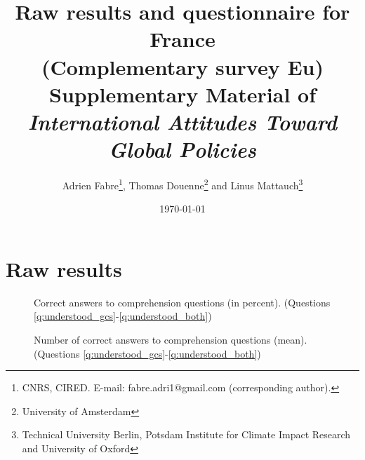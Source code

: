\documentclass[12pt,english]{article}
\title{Raw results and questionnaire for France \\
(Complementary survey Eu) \\ 
Supplementary Material of \\
\textit{International Attitudes Toward Global Policies}
}
\author{Adrien Fabre\footnote{CNRS, CIRED. E-mail: fabre.adri1@gmail.com (corresponding author).}, Thomas Douenne\footnote{University of Amsterdam}\; and Linus Mattauch\footnote{Technical University Berlin, Potsdam Institute for Climate Impact Research and University of Oxford}} %
\date{\today} %
\begin{document}
\maketitle

\tableofcontents

\clearpage
\listoffigures


\clearpage
\section{Raw results}\label{app:raw_results_FR}

\begin{figure}[h!]
    \caption[Comprehension]{Correct answers to comprehension questions (in percent). (Questions \ref{q:understood_gcs}-\ref{q:understood_both})}\label{fig:understood_each}
\end{figure}

\begin{figure}[h!]
    \caption[Comprehension score]{Number of correct answers to comprehension questions (mean). (Questions \ref{q:understood_gcs}-\ref{q:understood_both})}\label{fig:understood_score}
\end{figure}
\end{document}
